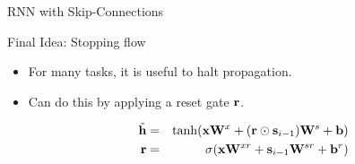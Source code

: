 \documentclass{beamer}
\begin{document}
\begin{frame}{RNN with Skip-Connections}
  \begin{center}
  \end{center}
\end{frame}

\begin{frame}{Final Idea: Stopping flow}
  \begin{itemize}
  \item For many tasks, it is useful to halt propagation.
    \air
  \item Can do this by applying a reset gate $\mathbf{r}$. 
    \air 

    \begin{eqnarray*}
      \tilde{\mathbf{h}} &=& \tanh(\mathbf{x} \mathbf{W}^x + (\mathbf{r} \odot \mathbf{s}_{i-1})  \mathbf{W}^s + \mathbf{b})  \\
      \mathbf{r} &=& \sigma(\mathbf{x} \mathbf{W}^{xr} + \mathbf{s}_{i-1}\mathbf{W}^{sr} + \mathbf{b}^r) \\
    \end{eqnarray*}

    
  \end{itemize}
\end{frame}
\end{document}
